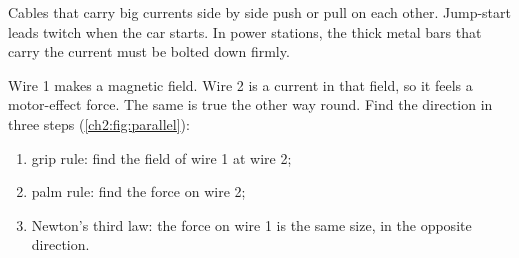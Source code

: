 \begin{keywords}
\end{keywords}

Cables that carry big currents side by side push or pull on each other. Jump-start leads twitch
when the car starts. In power stations, the thick metal bars that carry the current must be
bolted down firmly.

Wire 1 makes a magnetic field. Wire 2 is a current in that field, so it feels a motor-effect
force. The same is true the other way round. Find the direction in three steps
(\cref{ch2:fig:parallel}):
\begin{enumerate}
  \item grip rule: find the field of wire 1 at wire 2;
  \item palm rule: find the force on wire 2;
  \item Newton's third law: the force on wire 1 is the same size, in the opposite direction.
\end{enumerate}

